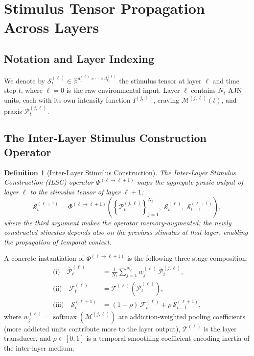 \documentclass[12pt,a4paper]{article}
\newtheorem{definition}{Definition}
\DeclareMathOperator{\softmax}{softmax}
\newcommand{\tens}[1]{\boldsymbol{\mathcal{#1}}}
\newcommand{\R}{\mathbb{R}}
\begin{document}
\section{Stimulus Tensor Propagation Across Layers}
\label{sec:propagation}

\subsection{Notation and Layer Indexing}

We denote by $\tens{S}_t^{(\ell)} \in \R^{d_1^{(\ell)} \times \cdots \times
d_{k_\ell}^{(\ell)}}$ the stimulus tensor at layer $\ell$ and time step $t$,
where $\ell = 0$ is the raw environmental input. Layer $\ell$ contains $N_\ell$
AJN units, each with its own intensity function $I^{(j,\ell)}$, craving
$\mathcal{M}^{(j,\ell)}(t)$, and praxis $\tens{P}_t^{(j,\ell)}$.

\subsection{The Inter-Layer Stimulus Construction Operator}

\begin{definition}[Inter-Layer Stimulus Construction]
\label{def:ilsc}
The \emph{Inter-Layer Stimulus Construction} (ILSC) operator
$\Phi^{(\ell \to \ell+1)}$ maps the aggregate praxic output of layer $\ell$ to
the stimulus tensor of layer $\ell+1$:
\begin{equation}
\tens{S}_t^{(\ell+1)} = \Phi^{(\ell \to \ell+1)}\!\left(
\left\{\tens{P}_t^{(j,\ell)}\right\}_{j=1}^{N_\ell},\;
\tens{S}_t^{(\ell)},\;
\tens{S}_{t-1}^{(\ell+1)}\right),
\label{eq:ilsc}
\end{equation}
where the third argument makes the operator \emph{memory-augmented}: the
newly constructed stimulus depends also on the previous stimulus at that layer,
enabling the propagation of temporal context.
\end{definition}

A concrete instantiation of $\Phi^{(\ell \to \ell+1)}$ is the following
three-stage composition:
\begin{align}
\text{(i)}\quad
\overline{\tens{P}}_t^{(\ell)} &= \frac{1}{N_\ell}
    \sum_{j=1}^{N_\ell} w_j^{(\ell)}\, \tens{P}_t^{(j,\ell)},
    \label{eq:pool}\\[4pt]
\text{(ii)}\quad
\tens{F}_t^{(\ell)} &= \mathcal{T}^{(\ell)}\!\left(
    \overline{\tens{P}}_t^{(\ell)}\right),
    \label{eq:transduce}\\[4pt]
\text{(iii)}\quad
\tens{S}_t^{(\ell+1)} &= (1-\rho)\,\tens{F}_t^{(\ell)}
    + \rho\,\tens{S}_{t-1}^{(\ell+1)},
    \label{eq:memory}
\end{align}
where $w_j^{(\ell)} = \softmax(\mathcal{M}^{(j,\ell)})$ are addiction-weighted
pooling coefficients (more addicted units contribute more to the layer output),
$\mathcal{T}^{(\ell)}$ is the layer transducer, and $\rho \in [0,1]$ is a
temporal smoothing coefficient encoding inertia of the inter-layer medium.
\end{document}
